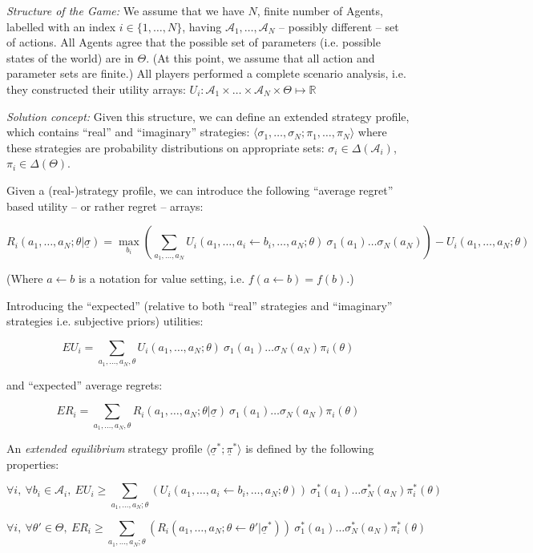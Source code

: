 \documentclass{article}
\begin{document}
{\it Structure of the Game:}
We assume that we have $N$, finite number of Agents, labelled with an index $i \in \{1,\dots,N\}$, having $\mathcal{A}_1,\dots,\mathcal{A}_N$ -- possibly different -- set of actions.
All Agents agree that the possible set of parameters (i.e. possible states of the world) are in $\Theta$.
(At this point, we assume that all action and parameter sets are finite.)
All players performed a complete scenario analysis, i.e. they constructed their utility arrays:
$U_i : \mathcal{A}_1 \times \dots \times \mathcal{A}_N \times \Theta \mapsto \mathbb{R}$

{\it Solution concept:}
Given this structure, we can define an extended strategy profile, which contains ``real'' and ``imaginary'' strategies: $\langle \sigma_1,\dots,\sigma_N; \pi_1,\dots,\pi_N \rangle$ where these strategies are probability distributions on appropriate sets:
$\sigma_i \in \Delta(\mathcal{A}_i)$, $\pi_i \in \Delta(\Theta)$.

Given a (real-)strategy profile, we can introduce the following ``average regret'' based utility -- or rather regret --  arrays:

\[
R_i (a_1,\dots,a_N;\theta | \underline{\sigma}) = \max_{b_i} 
\left (
\sum_{a_1,\dots,a_N} U_i(a_1,\dots,a_i \leftarrow b_i,\dots,a_N;\theta) \ 
\sigma_1(a_1) \dots \sigma_N(a_N)
\right )
- U_i(a_1,\dots,a_N;\theta)
\]

(Where $a \leftarrow b$ is a notation for value setting, i.e. $f(a \leftarrow b) = f(b)$.)

Introducing the ``expected'' (relative to both ``real'' strategies and ``imaginary'' strategies i.e. subjective priors) utilities:

\[
EU_i = 
\sum_{a_1,\dots,a_N,\theta} 
U_i(a_1,\dots,a_N;\theta) \ \sigma_1(a_1) \dots \sigma_N(a_N) \pi_i(\theta)
\]

and ``expected'' average regrets:

\[
ER_i =
\sum_{a_1,\dots,a_N,\theta} 
R_i(a_1,\dots,a_N;\theta | \underline{\sigma}) \ \sigma_1(a_1)\dots\sigma_N(a_N) \pi_i(\theta)
\]

An \emph{extended equilibrium} strategy profile $\langle \underline{\sigma}^*; \underline{\pi}^* \rangle$ is defined by the following properties:

\[
\forall i, \
\forall b_i \in \mathcal{A}_i, \ 
EU_i \ge
\sum_{a_1,\dots,a_N;\theta} 
\left (
U_i(a_1,\dots,a_i \leftarrow b_i,\dots,a_N;\theta)
\right ) \ 
\sigma^*_1(a_1) \dots \sigma^*_N(a_N) \pi^*_i(\theta)
\]

\[
\forall i, \
\forall \theta' \in \Theta, \ 
ER_i \ge
\sum_{a_1,\dots,a_N;\theta} 
\left (
R_i(a_1,\dots,a_N;\theta \leftarrow \theta' | \underline{\sigma}^*)
\right ) \ 
\sigma^*_1(a_1) \dots \sigma^*_N(a_N) \pi^*_i(\theta)
\]
\end{document}
